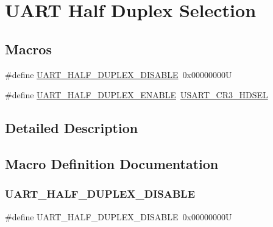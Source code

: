 \hypertarget{group___u_a_r_t___half___duplex___selection}{}\section{U\+A\+RT Half Duplex Selection}
\label{group___u_a_r_t___half___duplex___selection}
\subsection*{Macros}
\begin{DoxyCompactItemize}
\item 
\#define \mbox{\hyperlink{group___u_a_r_t___half___duplex___selection_ga282d253c045fd9a3785c6c3e3293346c}{U\+A\+R\+T\+\_\+\+H\+A\+L\+F\+\_\+\+D\+U\+P\+L\+E\+X\+\_\+\+D\+I\+S\+A\+B\+LE}}~0x00000000U
\item 
\#define \mbox{\hyperlink{group___u_a_r_t___half___duplex___selection_ga61e92cc4435c05d850f9fd5456f391e6}{U\+A\+R\+T\+\_\+\+H\+A\+L\+F\+\_\+\+D\+U\+P\+L\+E\+X\+\_\+\+E\+N\+A\+B\+LE}}~\mbox{\hyperlink{group___peripheral___registers___bits___definition_gac71129810fab0b46d91161a39e3f8d01}{U\+S\+A\+R\+T\+\_\+\+C\+R3\+\_\+\+H\+D\+S\+EL}}
\end{DoxyCompactItemize}


\subsection{Detailed Description}


\subsection{Macro Definition Documentation}
\mbox{\label{group___u_a_r_t___half___duplex___selection_ga282d253c045fd9a3785c6c3e3293346c}} 
\subsubsection{\texorpdfstring{UART\_HALF\_DUPLEX\_DISABLE}{UART\_HALF\_DUPLEX\_DISABLE}}
{\footnotesize\ttfamily \#define U\+A\+R\+T\+\_\+\+H\+A\+L\+F\+\_\+\+D\+U\+P\+L\+E\+X\+\_\+\+D\+I\+S\+A\+B\+LE~0x00000000U}

